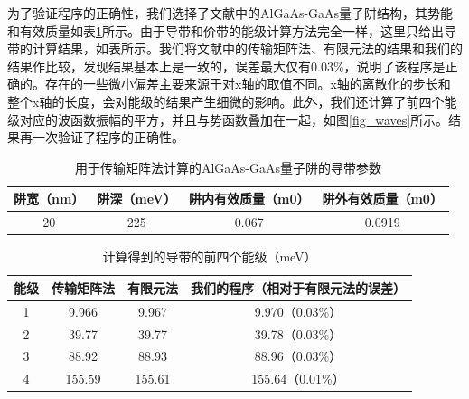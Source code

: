 \documentclass{ZJUthesis}
\begin{document}
为了验证程序的正确性，我们选择了文献中的AlGaAs-GaAs量子阱结构\cite{jonsson1990solving}，其势能和有效质量如表\ref{tmm_sample}所示。由于导带和价带的能级计算方法完全一样，这里只给出导带的计算结果，如表所示。我们将文献中的传输矩阵法\cite{jonsson1990solving}、有限元法\cite{nakamura1989finite}的结果和我们的结果作比较，发现结果基本上是一致的，误差最大仅有0.03\%，说明了该程序是正确的。存在的一些微小偏差主要来源于对x轴的取值不同。x轴的离散化的步长和整个x轴的长度，会对能级的结果产生细微的影响。此外，我们还计算了前四个能级对应的波函数振幅的平方，并且与势函数叠加在一起，如图\ref{fig_waves}所示。结果再一次验证了程序的正确性。

\begin{table}[!t]
    \caption{用于传输矩阵法计算的AlGaAs-GaAs量子阱的导带参数}
    \centering
    \label{tmm_sample}
    \begin{tabular}{cccc}
        \hline
        阱宽（nm） & 阱深（meV） & 阱内有效质量（m0） & 阱外有效质量（m0）\\
        \hline
        20                & 225                 & 0.067                          & 0.0919\\
        \hline
    \end{tabular}
\end{table}

\begin{table}[!t]
    \caption{计算得到的导带的前四个能级（meV）}
    \centering
    \label{tmm_sample_result}
    \begin{tabular}{cccc}
        \hline
        能级 & 传输矩阵法\cite{jonsson1990solving} & 有限元法\cite{nakamura1989finite} & 我们的程序（相对于有限元法的误差） \\
        \hline
        1       & 9.966              & 9.967            & 9.970（0.03\%） \\
        2       & 39.77              & 39.77            & 39.78（0.03\%） \\
        3       & 88.92              & 88.93            & 88.96（0.03\%） \\
        4       & 155.59            & 155.61          & 155.64（0.01\%） \\
        \hline
    \end{tabular}
\end{table}
\end{document}

